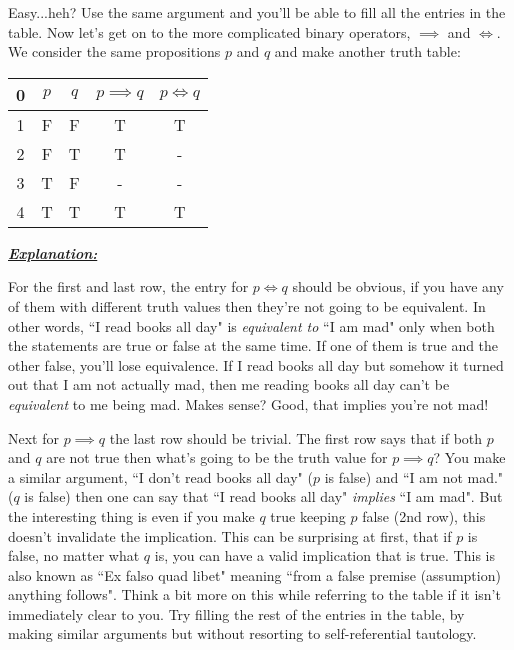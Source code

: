 \documentclass[a4paper]{article}
\begin{document}
\vspace{2.5mm}

Easy...heh? Use the same argument and you'll be able to fill all the entries in the table. Now let's get on to the more complicated binary operators, $\implies$ and $\iff$. We consider the same propositions $p$ and $q$ and make another truth table:

\begin{center}
	\begin{tabular}{c||c|c||c|c}
		0 & $p$ & $q$ & $p \implies q$ & $p \iff q$ \\
		\hline
		1 & F & F & T & T\\
		2 & F & T & T & - \\
		3 & T & F & - & - \\
		4 & T & T & T & T \\
	\end{tabular}
\end{center}

\textbf{\textit{\underline{Explanation:}}}

\vspace{2.5mm}

For the first and last row, the entry for $p \iff q $ should be obvious, if you have any of them with different truth values then they're not going to be equivalent. In other words, ``I read books all day" is \textit{equivalent to} ``I am mad" only when both the statements are true or false at the same time. If one of them is true and the other false, you'll lose equivalence. If I read books all day but somehow it turned out that I am not actually mad, then me reading books all day can't be \textit{equivalent} to me being mad. Makes sense? Good, that implies you're not mad!

Next for $p \implies q$ the last row should be trivial. The first row says that if both $p$ and $q$ are not true then what's going to be the truth value for $p \implies q$? You make a similar argument, ``I don't read books all day" ($p$ is false) and ``I am not mad." ($q$ is false) then one can say that ``I read books all day" \textit{implies} ``I am mad". But the interesting thing is even if you make $q$ true keeping $p$ false (2nd row), this doesn't invalidate the implication. This can be surprising at first, that if $p$ is false, no matter what $q$ is, you can have a valid implication that is true. This is also known as ``Ex falso quad libet" meaning ``from a false premise (assumption) anything follows". Think a bit more on this while referring to the table if it isn't immediately clear to you. Try filling the rest of the entries in the table, by making similar arguments but without resorting to self-referential tautology.   
\end{document}
